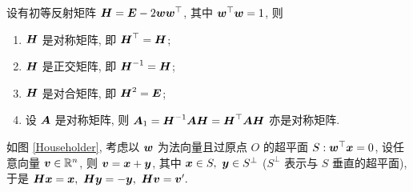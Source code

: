 \begin{theorem}
    设有初等反射矩阵 $\vb*{H}=\vb*{E}-2\vb*{ww}^\top$, 其中 $\vb*{w}^\top\vb*{w}=1$, 则 
    \begin{enumerate}[label=(\arabic{*})]
        \item $\vb*{H}$ 是对称矩阵, 即 $\vb*{H}^\top=\vb*{H}$;
        \item $\vb*{H}$ 是正交矩阵, 即 $\vb*{H}^{-1}=\vb*{H}$;
        \item $\vb*{H}$ 是对合矩阵, 即 $\vb*{H}^2=\vb*{E}$;
        \item 设 $\vb*{A}$ 是对称矩阵, 则 $\vb*{A}_1=\vb*{H}^{-1}\vb*{AH}=\vb*{H}^\top\vb*{AH}$ 亦是对称矩阵.
    \end{enumerate}
\end{theorem}
\begin{multicols}{2}
    如图 \ref{Householder}, 考虑以 $\vb*{w}$ 为法向量且过原点 $O$ 的超平面 $S:\vb*{w}^\top\vb*{x}=0$, 设任意向量 $\vb*{v}\in \mathbb{R}^{n}$, 则 $\vb*{v}=\vb*{x}+\vb*{y}$, 其中 $\vb*{x}\in S,~\vb*{y}\in S^{\bot }$ ($S^{\bot}$ 表示与 $S$ 垂直的超平面), 于是 $
\vb*{Hx}=\vb*{x},~ \vb*{Hy}=-\vb*{y},~ \vb*{Hv}=\vb*{v}'.
$
\begin{figure}[H]
    \centering
\begin{tikzpicture}[x=0.75pt,y=0.75pt,yscale=-1,xscale=1]


\end{tikzpicture}
\end{figure}
\end{multicols}
